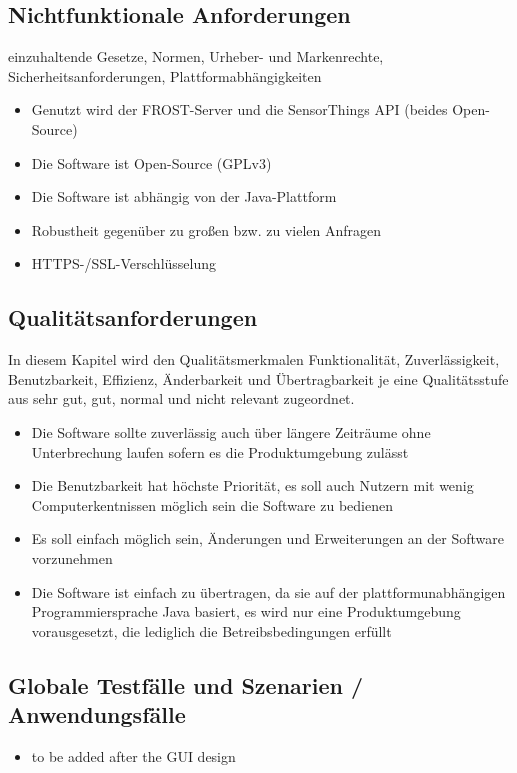 \documentclass[12 pt]{article}
\begin{document}
\subsection{Nichtfunktionale Anforderungen}
einzuhaltende Gesetze, Normen, Urheber- und Markenrechte,
Sicherheitsanforderungen, Plattformabhängigkeiten
\begin{itemize}
\item Genutzt wird der FROST-Server und die SensorThings API (beides Open-Source)
\item Die Software ist Open-Source (GPLv3)
\item Die Software ist abhängig von der Java-Plattform
\item Robustheit gegenüber zu großen bzw. zu vielen Anfragen
\item HTTPS-/SSL-Verschlüsselung
\end{itemize}


\subsection{Qualitätsanforderungen}
In diesem Kapitel wird den Qualitätsmerkmalen Funktionalität, Zuverlässigkeit, Benutzbarkeit, Effizienz, Änderbarkeit und Übertragbarkeit je eine Qualitätsstufe aus sehr gut, gut, normal und nicht relevant zugeordnet.
\begin{itemize}
\item Die Software sollte zuverlässig auch über längere Zeiträume ohne Unterbrechung laufen sofern es die Produktumgebung zulässt
\item Die Benutzbarkeit hat höchste Priorität, es soll auch Nutzern mit wenig Computerkentnissen möglich sein die Software zu bedienen
\item Es soll einfach möglich sein, Änderungen und Erweiterungen an der Software vorzunehmen
\item Die Software ist einfach zu übertragen, da sie auf der plattformunabhängigen Programmiersprache Java basiert, es wird nur eine Produktumgebung vorausgesetzt, die lediglich die Betreibsbedingungen erfüllt
\end{itemize}


\subsection{Globale Testfälle und Szenarien / Anwendungsfälle}
\begin{itemize}
\item to be added after the GUI design
\end{itemize}
\end{document}
